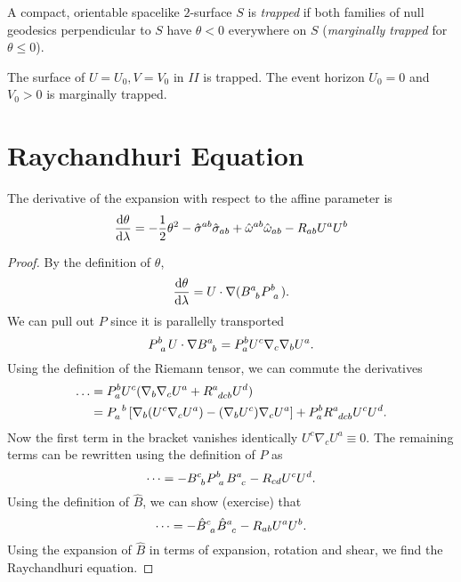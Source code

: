\begin{definition}[traped]
  A compact, orientable spacelike $2$-surface $S$ is \emph{trapped} if both families of null geodesics perpendicular to $S$ have $\theta < 0$ everywhere on $S$
  (\emph{marginally trapped} for $\theta \leq 0$).
\end{definition}

\begin{example}[Kruskal]
  The surface of $U = U_0, V = V_0$ in $II$ is trapped. The event horizon $U_0 =0$ and $V_0 > 0$ is marginally trapped.
\end{example}

\section{Raychandhuri Equation}%
\label{sec:raychandhuri_equation}

\begin{claim}
  The derivative of the expansion with respect to the affine parameter is
  \begin{equation}
    \label{eq:10-star}
    \dv{\theta}{\lambda} = -\frac{1}{2} \theta^2 - \hat{\sigma}^{ab} \hat{\sigma}_{ab} + \hat{\omega}^{ab} \hat{\omega}_{ab} - R_{ab} U^{a} U^{b}
  \end{equation}
\end{claim}
\begin{proof}
  By the definition of $\theta$,
  \begin{equation}
    \dv{\theta}{\lambda} = U \cdot \nabla (B\indices{^{a}_{b}} P\indices{^{b}_{a}}).
  \end{equation}
  We can pull out $P$ since it is parallelly transported 
  \begin{equation}
    P\indices{^{b}_{a}} U \cdot \nabla B\indices{^{a}_{b}} = P^b_a U^c \nabla_c \nabla_b U^a.
  \end{equation}
  Using the definition of the Riemann tensor, we can commute the derivatives
  \begin{align}
    \dots &= P_a^b U^c (\nabla_b \nabla_c U^a + R\indices{^{a}_{dcb}} U^d)  \\
	  &= P\indices{_{a}^{b}} \left[ \nabla_b (U^c \nabla_c U^a) - (\nabla_b U^c) \nabla_c U^a \right] + P_a^b R\indices{^{a}_{dcb}} U^c U^d.
  \end{align}
  Now the first term in the bracket vanishes identically $U^c \nabla_c U^a \equiv 0$.
  The remaining terms can be rewritten using the definition of $P$ as
  \begin{equation}
    \dots = -B\indices{^{c}_{b}} P\indices{^{b}_{a}} B\indices{^{a}_{c}} - R_{cd} U^{c} U^{d}.
  \end{equation}
  Using the definition of $\hat{B}$, we can show (exercise) that
  \begin{equation}
    \dots = -\hat{B}\indices{^{c}_{a}} \hat{B}\indices{^{a}_{c}} - R_{ab} U^a U^b.
  \end{equation}
  Using the expansion of $\hat{B}$ in terms of expansion, rotation and shear, we find the Raychandhuri equation.
\end{proof}

